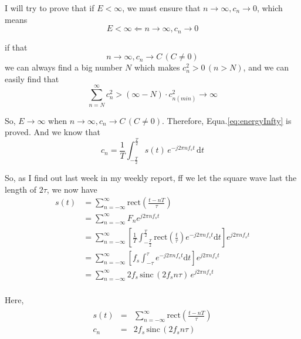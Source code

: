 \documentclass{article}
\begin{document}
I will try to prove that if $E < \infty$, we must ensure that $n \to \infty, c_n \to 0$, which means 
\begin{equation}
E < \infty \Leftarrow  n \to \infty, c_n \to 0
\label{eq:energyInfty}
\end{equation}

if that
$$
n  \to \infty, c_n \to C \, (C \neq 0)
$$
we can always find a big number $N$ which makes $c_n^2 > 0 \, (n > N) $, and we can easily find that
$$
\sum_{n = N}^{\infty} c_n^2 > (\infty - N) \cdot c^2_{n(min)} \to \infty
$$

So, $E\to \infty$ when $n  \to \infty, c_n \to C \, (C \neq 0)$.
Therefore, Equa.\ref{eq:energyInfty} is proved.
And we know that
\begin{equation}
    c_n = \frac{1}{T} \int_{-\frac{T}{2}}^{\frac{T}{2}} s(t) \, e^{-j2\pi n f_s t} \, \mathrm{d}t
\end{equation}

So, as I find out last week in my weekly report, ff we let the square wave last the length of $2\tau$, we now have
\begin{equation}
    \begin{aligned} s(t) & = \sum_{n = -\infty}^{\infty} \mathrm{rect} (\frac{t - nT}{\tau}) \\
             & = \sum_{n =-\infty}^{\infty}F_n e^{j2 \pi n f_s t}  \\
             & = \sum_{n = -\infty}^{\infty}\left[ \frac{1}{T} \int_{-\frac T2}^{\frac T2}
              \mathrm{rect}(\frac{t}{\tau}) e^{-j2 \pi n f_s t} \mathrm{d}t \right] e^{j2 \pi n f_s t} \\
             & = \sum_{n = -\infty}^{\infty}\left[ f_s \int_{-\tau}^{\tau} e^{-j2 \pi n f_s t} \mathrm{d}t \right] e^{j2 \pi n f_s t}  \\
             & = \sum_{n = -\infty}^{\infty}2f_s\, \mathrm{sinc} \,( 2f_s n\tau)\, e^{j2 \pi n f_s t} \\
             \label{eq:samplingSquare}
    \end{aligned}
\end{equation}

Here, 
\begin{align*}
\begin{array}{lrl}
s(t) &=& \sum_{n = -\infty}^{\infty} \mathrm{rect} (\frac{t - nT}{\tau}) \\ 
c_n  &=& 2f_s\, \mathrm{sinc} \,( 2f_s n\tau)
\end{array}
\end{align*}  
\end{document}
